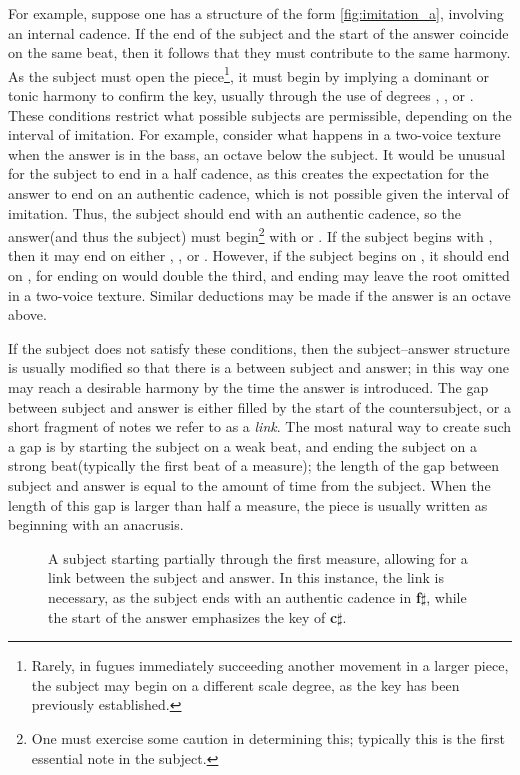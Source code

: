 For example, suppose one has a structure of the form \eqref{fig:imitation_a}, involving an internal cadence. If the end of the subject and the start of the answer coincide on the same beat, then it follows that they must contribute to the same harmony. As the subject must open the piece\footnote{Rarely, in fugues immediately succeeding another movement in a larger piece, the subject may begin on a different scale degree, as the key has been previously established.}, it must begin by implying a dominant or tonic harmony to confirm the key, usually through the use of degrees , , or . These conditions restrict what possible subjects are permissible, depending on the interval of imitation. For example, consider what happens in a two-voice texture when the answer is in the bass, an octave below the subject.  It would be unusual for the subject to end in a half cadence, as this creates the expectation for the answer to end on an authentic cadence, which is not possible given the interval of imitation. Thus, the subject should end with an authentic cadence, so the answer(and thus the subject) must begin\footnote{One must exercise some caution in determining this; typically this is the first essential note in the subject.} with  or . If the subject begins with , then it may end on either , , or . However, if the subject begins on , it should end on , for ending on  would double the third, and ending  may leave the root omitted in a two-voice texture. Similar deductions may be made if the answer is an octave above.

If the subject does not satisfy these conditions, then the subject--answer structure is usually modified so that there is a  between subject and answer; in this way one may reach a desirable harmony by the time the answer is introduced. The gap between subject and answer is either filled by the start of the countersubject, or a short fragment of notes we refer to as a \textit{link}. The most natural way to create such a gap is by starting the subject on a weak beat, and ending the subject on a strong beat(typically the first beat of a measure); the length of the gap between subject and answer is equal to the amount of time  from the subject. When the length of this gap is larger than half a measure, the piece is usually written as beginning with an anacrusis.

\begin{figure}
  \centering
  \caption{A subject starting partially through the first measure, allowing for a link between the subject and answer. In this instance, the link is necessary, as the subject ends with an authentic cadence in \textbf{f}$\sharp$, while the start of the answer emphasizes the key of \textbf{c}$\sharp$. }
\end{figure}

